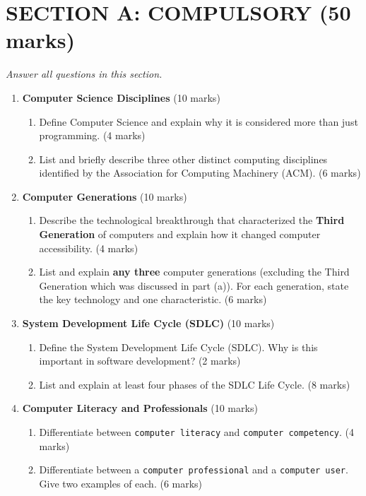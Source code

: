 \documentclass[12pt]{article}
\begin{document}
\newpage

\section*{SECTION A: COMPULSORY (50 marks)}
\textit{Answer all questions in this section.}

\begin{enumerate}[left=0pt, label=\bfseries Q\arabic*.]
    \item \textbf{Computer Science Disciplines} \hfill (10 marks)
    \begin{enumerate}[label=(\alph*)]
        \item Define Computer Science and explain why it is considered more than just programming. \hfill (4 marks)
        \item List and briefly describe three other distinct computing disciplines identified by the Association for Computing Machinery (ACM). \hfill (6 marks)
    \end{enumerate}

    \item \textbf{Computer Generations} \hfill (10 marks)
    \begin{enumerate}[label=(\alph*)]
        \item Describe the technological breakthrough that characterized the \textbf{Third Generation} of computers and explain how it changed computer accessibility. \hfill (4 marks)
        \item List and explain \textbf{any three} computer generations (excluding the Third Generation which was discussed in part (a)). For each generation, state the key technology and one characteristic. \hfill (6 marks)
    \end{enumerate}

    \item \textbf{System Development Life Cycle (SDLC)} \hfill (10 marks)
    \begin{enumerate}[label=(\alph*)]
        \item Define the System Development Life Cycle (SDLC). Why is this important in software development? \hfill (2 marks)
        \item List and explain at least four phases of the SDLC Life Cycle. \hfill (8 marks)
    \end{enumerate}

    \item \textbf{Computer Literacy and Professionals} \hfill (10 marks)
    \begin{enumerate}[label=(\alph*)]
        \item Differentiate between \texttt{computer literacy} and \texttt{computer competency}. \hfill (4 marks)
        \item Differentiate between a \texttt{computer professional} and a \texttt{computer user}. Give two examples of each. \hfill (6 marks)
    \end{enumerate}


\end{enumerate}
\end{document}
